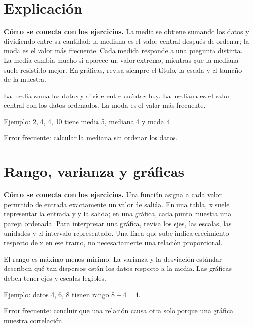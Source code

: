 \documentclass[10pt,oneside,openany]{book}
\begin{document}
\section{Explicación}

\textbf{Cómo se conecta con los ejercicios.} La media se obtiene sumando los datos y dividiendo entre su cantidad; la mediana es el valor central después de ordenar; la moda es el valor más frecuente. Cada medida responde a una pregunta distinta. La media cambia mucho si aparece un valor extremo, mientras que la mediana suele resistirlo mejor. En gráficas, revisa siempre el título, la escala y el tamaño de la muestra.

La media suma los datos y divide entre cuántos hay. La mediana es el valor central con los datos ordenados. La moda es el valor más frecuente.



\begin{ejemplo}
Ejemplo: 2, 4, 4, 10 tiene media 5, mediana 4 y moda 4.
\end{ejemplo}

\begin{ojo}
Error frecuente: calcular la mediana sin ordenar los datos.
\end{ojo}



\section{Rango, varianza y gráficas}

\textbf{Cómo se conecta con los ejercicios.} Una función asigna a cada valor permitido de entrada exactamente un valor de salida. En una tabla, x suele representar la entrada y y la salida; en una gráfica, cada punto muestra una pareja ordenada. Para interpretar una gráfica, revisa los ejes, las escalas, las unidades y el intervalo representado. Una línea que sube indica crecimiento respecto de x en ese tramo, no necesariamente una relación proporcional.

El rango es máximo menos mínimo. La varianza y la desviación estándar describen qué tan dispersos están los datos respecto a la media. Las gráficas deben tener ejes y escalas legibles.

\begin{ejemplo}
Ejemplo: datos 4, 6, 8 tienen rango $8-4=4$.
\end{ejemplo}

\begin{ojo}
Error frecuente: concluir que una relación causa otra solo porque una gráfica muestra correlación.
\end{ojo}
\end{document}
